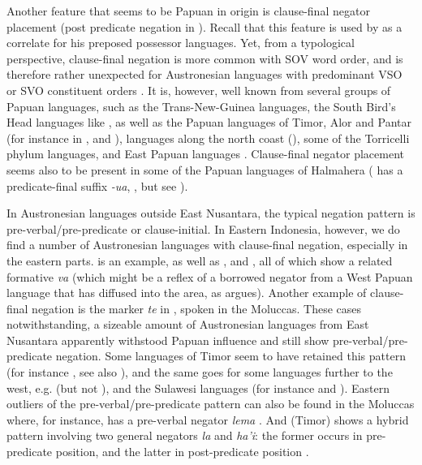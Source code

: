 Another feature that seems to be Papuan in origin is clause-final negator placement (post predicate negation in \citealt{klamer2008east}). Recall that this feature is used by \citet{Himmelmann2005austronesian} as a correlate for his preposed possessor languages. Yet, from a typological perspective, clause-final negation is more common with SOV word order, and is therefore rather unexpected for Austronesian languages with predominant VSO or SVO constituent orders \citep{klamer2008east}. It is, however, well known from several groups of Papuan languages, such as the Trans-New-Guinea languages, the South Bird's Head languages like , as well as the Papuan languages of Timor, Alor and Pantar (for instance in ,  and ),  languages along the north coast (), some of the Torricelli phylum languages, and East Papuan languages \citep{klamer2008east}. Clause-final negator placement seems also to be present in some of the Papuan languages of Halmahera ( has a predicate-final suffix \textit{-ua}, \citealt{holton2003tobelo}, but see \citealt[131]{klamer2008east}).

In Austronesian languages outside East Nusantara, the typical negation pattern is pre-verbal/pre-predicate or clause-initial. In Eastern Indonesia, however, we do find a number of Austronesian languages with clause-final negation, especially in the eastern parts.  is an example, as well as ,  and  \citep{gasser2014windesi}, all of which show a related formative \textit{va} (which might be a reflex of a borrowed negator from a West Papuan language that has diffused into the area, as \citet{reesink2002eastern} argues). Another example of clause-final negation is the marker \textit{te} in , spoken in the Moluccas. These cases notwithstanding, a sizeable amount of Austronesian languages from East Nusantara apparently withstood Papuan influence and still show pre-verbal/pre-predicate negation. Some languages of Timor seem to have retained this pattern (for instance , see also \citealt[132]{klamer2008east}), and the same goes for some languages further to the west, e.g.  (but not ), and the Sulawesi languages (for instance  and ). Eastern outliers of the pre-verbal/pre-predicate pattern can also be found in the Moluccas where, for instance,  has a pre-verbal negator \textit{lema} \citep[140]{coward2005}. And  (Timor) shows a hybrid pattern involving two general negators \textit{la} and \textit{ha'i}: the former occurs in pre-predicate position, and the latter in post-predicate position \citep[228]{vanklinken1999grammar}.

